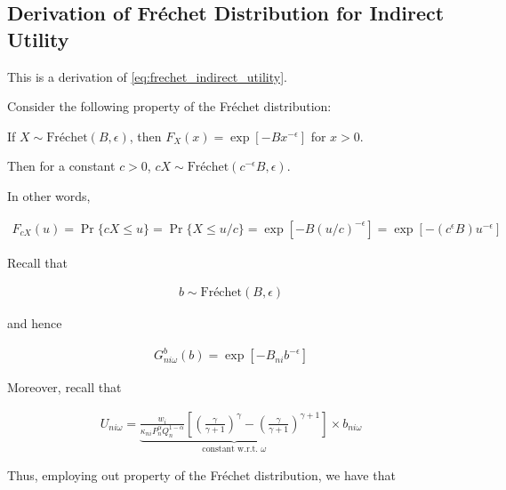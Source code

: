\documentclass[10pt]{article}
\begin{document}

\subsection{Derivation of Fréchet Distribution for Indirect Utility}
\label{sec:frechet_indirect_utility}

This is a derivation of \eqref{eq:frechet_indirect_utility}.

Consider the following property of 
the Fréchet distribution:

\begin{notes}
    If $X \sim \text{Fréchet}(B, \epsilon)$, then $F_X(x)=\exp \left[-B x^{-\epsilon}\right]$ for $x>0$.

    Then for a constant $c>0$, $cX \sim \text{Fréchet}\left(c^{-\epsilon} B, \epsilon\right)$.
    
    In other words, 

    \begin{align}
        F_{c X}(u)=\operatorname{Pr}\{c X \leq u\}=\operatorname{Pr}\{X \leq u / c\}=\exp \left[-B(u / c)^{-\epsilon}\right]=\exp \left[-\left(c^{\epsilon} B\right) u^{-\epsilon}\right]
    \end{align}

\end{notes}


Recall that

\begin{align}
    b \sim \text{Fréchet}(B, \epsilon)
\end{align}

and hence

\begin{align}
    G^b_{n i \omega}(b)=\exp \left[-B_{n i} b^{-\epsilon}\right]
\end{align}

Moreover, recall that

\begin{align}
    U_{n i \omega}=\underbrace{\frac{w_i}{\kappa_{n i} P_n^\alpha Q_n^{1-\alpha}} \left[\left(\frac{\gamma}{\gamma+1}\right)^\gamma-\left(\frac{\gamma}{\gamma+1}\right)^{\gamma+1}\right]}_{\text {constant w.r.t. } \omega} \times b_{n i \omega}
\end{align}

Thus, employing out property of the Fréchet distribution, we have that
\end{document}
